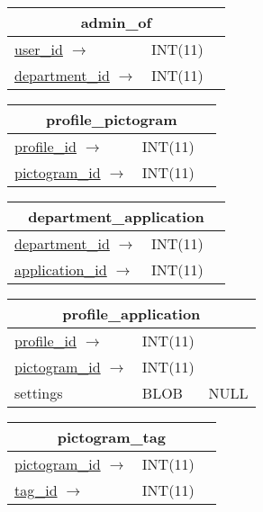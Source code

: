 \vspace{10pt}

\begin{tabular}{|l|l|c|}
\hline
\multicolumn{3}{|c|}{admin\_of} \\
\hline
\underline{user\_id} $ \rightarrow $ & INT(11) & \\
\underline{department\_id} $ \rightarrow $ & INT(11) & \\
\hline
\end{tabular}

\vspace{10pt}

\begin{tabular}{|l|l|c|}
\hline
\multicolumn{3}{|c|}{profile\_pictogram} \\
\hline
\underline{profile\_id} $ \rightarrow $ & INT(11) & \\
\underline{pictogram\_id} $ \rightarrow $ & INT(11) & \\
\hline
\end{tabular}

\vspace{10pt}

\begin{tabular}{|l|l|c|}
\hline
\multicolumn{3}{|c|}{department\_application} \\
\hline
\underline{department\_id} $ \rightarrow $ & INT(11) & \\
\underline{application\_id} $ \rightarrow $ & INT(11) & \\
\hline
\end{tabular}

\vspace{10pt}

\begin{tabular}{|l|l|c|}
\hline
\multicolumn{3}{|c|}{profile\_application} \\
\hline
\underline{profile\_id} $ \rightarrow $ & INT(11) & \\
\underline{pictogram\_id} $ \rightarrow $ & INT(11) & \\
settings & BLOB & NULL \\
\hline
\end{tabular}

\vspace{10pt}

\begin{tabular}{|l|l|c|}
\hline
\multicolumn{3}{|c|}{pictogram\_tag} \\
\hline
\underline{pictogram\_id} $ \rightarrow $ & INT(11) & \\
\underline{tag\_id} $ \rightarrow $ & INT(11) & \\
\hline
\end{tabular}

